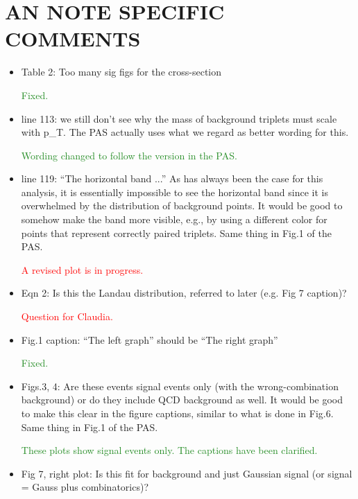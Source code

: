 \documentclass[paper=a4, fontsize=11pt]{scrartcl}
\begin{document}
\section{AN NOTE SPECIFIC COMMENTS}
\begin{itemize}
\item Table 2: Too many sig figs for the cross-section

\textcolor{ForestGreen}{Fixed.}\\

\item line 113: we still don't see why the mass of background triplets must scale with p\_T. The PAS actually uses what we regard as better wording for this.

\textcolor{ForestGreen}{Wording changed to follow the version in the PAS.}\\

\item line 119: ``The horizontal band ...'' As has always been the case for this analysis, it is essentially impossible to see the horizontal band since it is overwhelmed by the distribution of background points. It would be good to somehow make the band more visible, e.g., by using a different color for points that represent correctly paired triplets. Same thing in Fig.1 of the PAS.

\textcolor{red}{A revised plot is in progress.}\\

\item Eqn 2: Is this the Landau distribution, referred to later (e.g. Fig 7 caption)?

\textcolor{red}{Question for Claudia.}\\

\item Fig.1 caption: ``The left graph'' should be ``The right graph''

\textcolor{ForestGreen}{Fixed.}\\

\item Figs.3, 4: Are these events signal events only (with the wrong-combination background) or do they include QCD background as well. It would be good to make this clear in the figure captions, similar to what is done in Fig.6. Same thing in Fig.1 of the PAS.

\textcolor{ForestGreen}{These plots show signal events only. The captions have been clarified.}\\

\item Fig 7, right plot: Is this fit for background and just Gaussian signal (or signal = Gauss plus combinatorics)?


\end{itemize}
\end{document}
